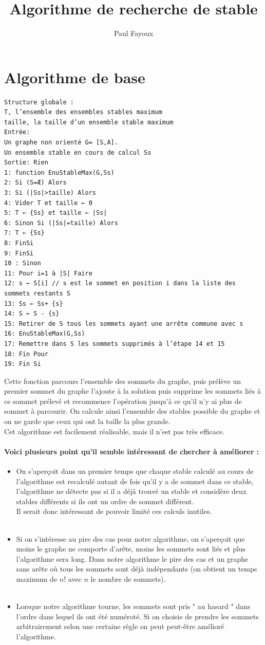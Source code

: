 \documentclass[10pt,a4paper]{article}
\author{Paul Fayoux}
\title{Algorithme de recherche de stable}
\begin{document}
\section{Algorithme de base}

\begin{verbatim}
Structure globale :
T, l’ensemble des ensembles stables maximum
taille, la taille d’un ensemble stable maximum
Entrée:
Un graphe non orienté G= [S,A].
Un ensemble stable en cours de calcul Ss
Sortie: Rien
1: function EnuStableMax(G,Ss)
2: Si (S=Æ) Alors
3: Si (|Ss|>taille) Alors
4: Vider T et taille ← 0
5: T ← {Ss} et taille ← |Ss|
6: Sinon Si (|Ss|=taille) Alors
7: T ← {Ss}
8: FinSi
9: FinSi
10 : Sinon
11: Pour i=1 à |S| Faire
12: s ← S[i] // s est le sommet en position i dans la liste des sommets restants S
13: Ss ← Ss+ {s}
14: S ← S - {s}
15: Retirer de S tous les sommets ayant une arrête commune avec s
16: EnuStableMax(G,Ss)
17: Remettre dans S les sommets supprimés à l’étape 14 et 15
18: Fin Pour
19: Fin Si
\end{verbatim}

Cette fonction parcours l'ensemble des sommets du graphe, puis prélève un premier sommet du graphe l'ajoute à la solution puis supprime les sommets liés à ce sommet prélevé et recommence l'opération jusqu'à ce qu'il n'y ai plus de sommet à parcourir. On calcule ainsi l'ensemble des stables possible du graphe et on ne garde que ceux qui ont la taille la plus grande.
\\
Cet algorithme est facilement réalisable, mais il n'est pas très efficace.

\paragraph{Voici plusieurs point qu'il semble intéressant de chercher à améliorer :}

\begin{itemize}
\item On s'aperçoit dans un premier temps que chaque stable calculé au cours de l'algorithme est recalculé autant de fois qu'il y a de sommet dans ce stable, l'algorithme ne détecte pas si il a déjà trouvé un stable et considère deux stables différents si ils ont un ordre de sommet différent. \\ 
Il serait donc intéressant de pouvoir limité ces calculs inutiles.
\\\\
\item Si on s'intéresse au pire des cas pour notre algorithme, on s'aperçoit que moins le graphe ne comporte d'arête, moins les sommets sont liés et plus l'algorithme sera long. Dans notre algorithme le pire des cas et un graphe sans arête où tous les sommets sont déjà indépendants (on obtient un temps maximum de $n!$ avec $n$ le nombre de sommets).
\\\\
\item Lorsque notre algorithme tourne, les sommets sont pris " au hasard " dans l'ordre dans lequel ils ont été numéroté. Si on choisie de prendre les sommets arbitrairement selon une certaine règle on peut peut-être amélioré l'algorithme.
\end{itemize}
\end{document}
